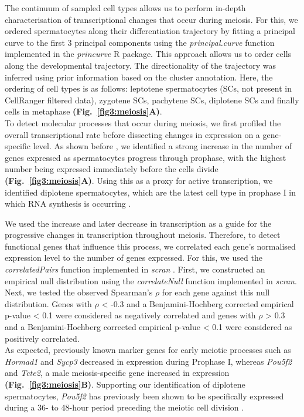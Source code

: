The continuum of sampled cell types allows us to perform in-depth characterisation of transcriptional changes that occur during meiosis. For this, we ordered spermatocytes along their differentiation trajectory by fitting a principal curve \citep{Hastie1989} to the first 3 principal components using the \emph{principal.curve} function implemented in the \emph{princurve} R package. This approach allows us to order cells along the developmental trajectory. The directionality of the trajectory was inferred using prior information based on the cluster annotation. Here, the ordering of cell types is as follows: leptotene spermatocytes (SCs, not present in CellRanger filtered data), zygotene SCs, pachytene SCs, diplotene SCs and finally cells in metaphase \textbf{(Fig.~\ref{fig3:meiosis}A)}. \\

To detect molecular processes that occur during meiosis, we first profiled the overall transcriptional rate before dissecting changes in expression on a gene-specific level. As shown before \citep{Xia2018}, we identified a strong increase in the number of genes expressed as spermatocytes progress through prophase, with the highest number being expressed immediately before the cells divide \textbf{(Fig.~\ref{fig3:meiosis}A)}. Using this as a proxy for active transcription, we identified diplotene spermatocytes, which are the latest cell type in prophase I in which RNA synthesis is occurring \citep{Monesi1965}. 

\newpage

We used the increase and later decrease in transcription as a guide for the progressive changes in transcription throughout meiosis. Therefore, to detect functional genes that influence this process, we correlated each gene’s normalised expression level to the number of genes expressed. For this, we used the \emph{correlatedPairs} function implemented in \emph{scran} \citep{Lun2016}. First, we constructed an empirical null distribution using the \emph{correlateNull} function implemented in \emph{scran}. Next, we tested the observed Spearman’s $\rho$ for each gene against this null distribution. Genes with $\rho$ < -0.3 and a Benjamini-Hochberg corrected empirical p-value < 0.1 were considered as negatively correlated and genes with $\rho$ > 0.3 and a Benjamini-Hochberg corrected empirical p-value < 0.1 were considered as positively correlated.\\

As expected, previously known marker genes for early meiotic processes such as \textit{Hormad1} and \textit{Sycp3} decreased in expression during Prophase I, whereas \textit{Pou5f2} and \textit{Tcte2}, a male meiosis-specific gene \citep{Braidotti1997} increased in expression \textbf{(Fig.~\ref{fig3:meiosis}B)}. Supporting our identification of diplotene spermatocytes, \textit{Pou5f2} has previously been shown to be specifically expressed during a 36- to 48-hour period preceding the meiotic cell division \citep{Andersen1993}. \\

